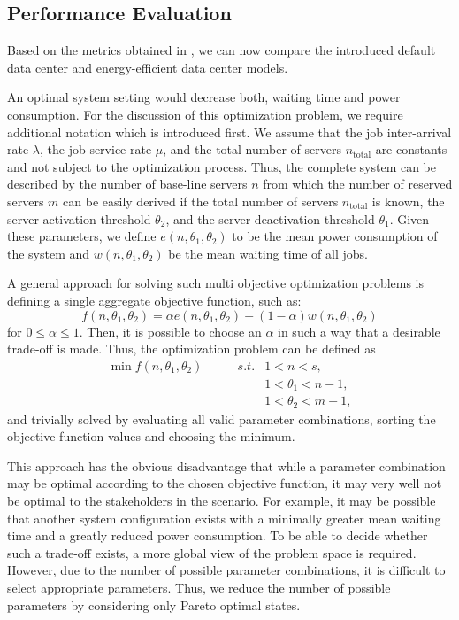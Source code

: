 \subsection{Performance Evaluation}\label{sec:cloud:data_centers:performance_evaluation}
Based on the metrics obtained in , we can now compare the introduced default data center and energy-efficient data center models.

An optimal system setting would decrease both, waiting time and power consumption.
For the discussion of this optimization problem, we require additional notation which is introduced first.
We assume that the job inter-arrival rate \(\lambda\), the job service rate \(\mu\), and the total number of servers \(n_\text{total}\) are constants and not subject to the optimization process.
Thus, the complete system can be described by the number of base-line servers \(n\) from which the number of reserved servers \(m\) can be easily derived if the total number of servers \(n_\text{total}\) is known, the server activation threshold \(\theta_2\), and the server deactivation threshold \(\theta_1\).
Given these parameters, we define \(e(n, \theta_1, \theta_2)\) to be the mean power consumption of the system and \(w(n, \theta_1, \theta_2)\) be the mean waiting time of all jobs.

A general approach for solving such multi objective optimization problems is defining a single aggregate objective function, such as:
\begin{equation}
f(n, \theta_1, \theta_2) = \alpha e(n, \theta_1, \theta_2)  + (1-\alpha) w(n, \theta_1, \theta_2)
\end{equation}
for \(0\leq\alpha\leq 1\).
Then, it is possible to choose an \(\alpha\) in such a way that a desirable trade-off is made. Thus, the optimization problem can be defined as
\begin{align}
\min f(n, \theta_1, \theta_2) \qquad&s.t.& 1 < n < s,\\ 
&&1 < \theta_1 < n - 1,\nonumber\\
&&1 < \theta_2 < m - 1\nonumber,
\end{align}
and trivially solved by evaluating all valid parameter combinations, sorting the objective function values and choosing the minimum.

This approach has the obvious disadvantage that while a parameter combination may be optimal according to the chosen objective function, it may very well not be optimal to the stakeholders in the scenario.
For example, it may be possible that another system configuration exists with a minimally greater mean waiting time and a greatly reduced power consumption.
To be able to decide whether such a trade-off exists, a more global view of the problem space is required.
However, due to the number of possible parameter combinations, it is difficult to select appropriate parameters.
Thus, we reduce the number of possible parameters by considering only Pareto optimal states.


